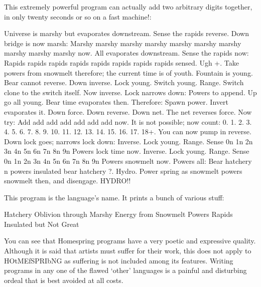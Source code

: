 \documentclass[10pt]{article}
\begin{document}
\newpage
This extremely powerful program can actually add two arbitrary digits together, in only twenty seconds or so on a fast machine!:

\begin{verbatim*}
Universe is marshy but evaporates downstream. Sense the rapids reverse. Down
bridge is now marsh:
Marshy marshy marshy marshy marshy marshy marshy marshy marshy marshy now.
All evaporates downstream. Sense
the rapids now:
Rapids rapids rapids rapids rapids rapids rapids rapids sensed.
Ugh +. 
 Take powers from                  snowmelt  therefore;
                 the   current time is of youth. Fountain is young. Bear cannot
reverse. Down inverse. Lock young. Switch young. Range. Switch clone to the
switch itself. Now inverse. Lock narrows down:
    Powers
       to   append. Up go all young. Bear time evaporates
then. Therefore:
Spawn power. Invert evaporates it. Down force. Down reverse. Down net. The
 net reverses force.
Now try:
Add add add add add add add now.
It is not possible; now count:
0.
1.
2.
3.
4.
5.
6.
7.
8.
9.
10.
11.
12.
13.
14.
15.
16.
17.
18+.
                                    You   can   now   pump
in reverse. Down lock goes; narrows lock down:
Inverse. Lock young. Range. Sense 0n 1n 2n 3n 4n 5n 6n 7n 8n 9n
          Powers         lock time now.
Inverse. Lock young. Range. Sense 0n 1n 2n 3n 4n 5n 6n 7n 8n 9n
          Powers            snowmelt   now.
    Powers
      all:
Bear hatchery n
 powers
               insulated bear hatchery ?. 
 Hydro. Power spring as
 snowmelt         powers   snowmelt  then, and disengage.
HYDRO!!
\end{verbatim*}

\newpage
This program is the language's name. It prints a bunch of various stuff:

\begin{verbatim*}
Hatchery
Oblivion through
Marshy
Energy from
Snowmelt
Powers
Rapids
Insulated but
Not
Great
\end{verbatim*}

You can see that Homespring programs have a very poetic and expressive quality. Although it is said that artists must suffer for their work, this does not apply to HOtMEfSPRIbNG as suffering is not included among its features. Writing programs in any one of the flawed `other' languages is a painful and disturbing ordeal that is best avoided at all costs. 
\end{document}
